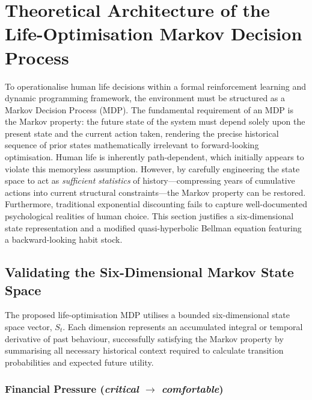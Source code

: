 \documentclass[11pt, a4paper]{article}
\begin{document}
\section{Theoretical Architecture of the Life-Optimisation Markov Decision Process}

To operationalise human life decisions within a formal reinforcement learning and dynamic
programming framework, the environment must be structured as a Markov Decision Process (MDP).
The fundamental requirement of an MDP is the Markov property: the future state of the system
must depend solely upon the present state and the current action taken, rendering the precise
historical sequence of prior states mathematically irrelevant to forward-looking optimisation.
Human life is inherently path-dependent, which initially appears to violate this memoryless
assumption. However, by carefully engineering the state space to act as \emph{sufficient
statistics} of history---compressing years of cumulative actions into current structural
constraints---the Markov property can be restored. Furthermore, traditional exponential
discounting fails to capture well-documented psychological realities of human choice. This
section justifies a six-dimensional state representation and a modified quasi-hyperbolic
Bellman equation featuring a backward-looking habit stock.

\subsection{Validating the Six-Dimensional Markov State Space}

The proposed life-optimisation MDP utilises a bounded six-dimensional state space vector,
$S_t$. Each dimension represents an accumulated integral or temporal derivative of past
behaviour, successfully satisfying the Markov property by summarising all necessary historical
context required to calculate transition probabilities and expected future utility.

\subsubsection{Financial Pressure (\textit{critical} $\rightarrow$ \textit{comfortable})}
\end{document}
